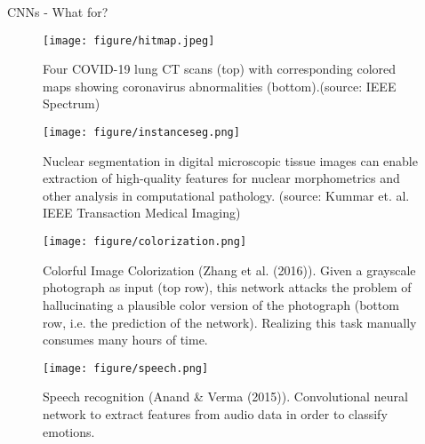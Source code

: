 \begin{vbframe}{CNNs - What for?}
   \begin{figure}
    \centering
    \texttt{[image: figure/hitmap.jpeg]}
    \caption{Four COVID-19 lung CT scans (top) with corresponding colored maps showing coronavirus abnormalities (bottom).(source: IEEE Spectrum)}
  \end{figure}
\framebreak

  \begin{figure}
    \centering
    \texttt{[image: figure/instanceseg.png]}
    \caption{Nuclear segmentation in digital microscopic tissue images can enable extraction of high-quality features for nuclear morphometrics and other analysis in computational pathology. (source: Kummar et. al. IEEE Transaction Medical Imaging) }
  \end{figure}
\framebreak

  \begin{figure}
    \centering
    \texttt{[image: figure/colorization.png]}
    \caption{Colorful Image Colorization (Zhang et al. (2016)). Given a grayscale photograph as input (top row), this network attacks the problem of hallucinating a plausible color version of the photograph (bottom row, i.e. the prediction of the network). Realizing this task manually consumes many hours of time.}
  \end{figure}
\framebreak


  \begin{figure}
    \centering
    \texttt{[image: figure/speech.png]}
    \caption{Speech recognition (Anand \& Verma (2015)). Convolutional neural network to extract features from audio data in order to classify emotions.}
  \end{figure}
\end{vbframe}


\endlecture

